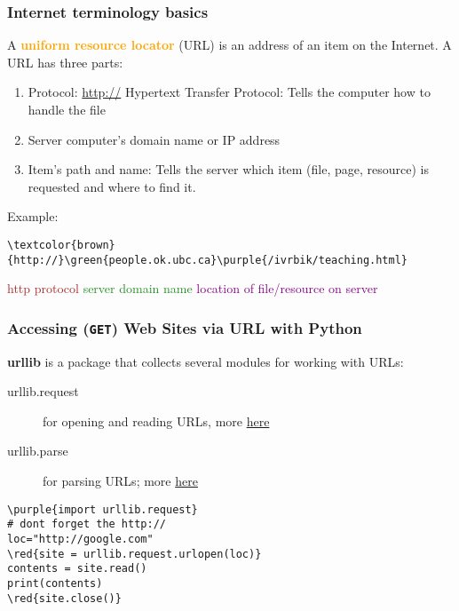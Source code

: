 \documentclass[xcolor=svgnames]{beamer}
\newcommand{\red}[1]{\textcolor{red}{#1}}
\newcommand{\green}[1]{\textcolor{ForestGreen}{#1}}
\newcommand{\purple}[1]{{\textcolor{purple}{#1}}}
\newcommand{\define}[1]{\textbf{\textcolor{orange}{#1}}}
\newcommand{\ft}[1]{\frametitle{#1}}
\begin{document}

\begin{frame}[fragile]\ft{Internet terminology basics}
\vfill
A \define{uniform resource locator} (URL) is an address of an item on the Internet. A URL has three parts:
\begin{enumerate}
\vfill
\item Protocol: \url{http://} Hypertext Transfer Protocol: Tells the computer how to handle the file
\item Server computer's domain name or IP address
\item Item's path and name:
Tells the server which item (file, page, resource) is requested and where to find it.
\end{enumerate}
\vfill
Example:
\begin{Verbatim}[xleftmargin=.5in,commandchars=\\\{\}]
\textcolor{brown}{http://}\green{people.ok.ubc.ca}\purple{/ivrbik/teaching.html}
\end{Verbatim}
 \textcolor{brown}{http protocol} \green{server domain name} \purple{location of file/resource on server}
 \vfill
\end{frame}






\begin{frame}[fragile]\ft{Accessing ({\tt GET}) Web Sites via URL with Python}
{\bf urllib} is a package that collects several modules for working with URLs: 
\begin{description}
\item[urllib.request] for opening and reading URLs, more \href{https://docs.python.org/3/library/urllib.request.html#module-urllib.request}{here}
\item[urllib.parse] for parsing URLs; more  \href{https://docs.python.org/3/library/urllib.parse.html#module-urllib.parse}{here}
\end{description}

\begin{Verbatim}[xleftmargin=.1in,commandchars=\\\{\}]
\purple{import urllib.request}
# dont forget the http://
loc="http://google.com"
\red{site = urllib.request.urlopen(loc)}
contents = site.read()
print(contents)
\red{site.close()}
\end{Verbatim}
\end{frame}
  
\end{document}
